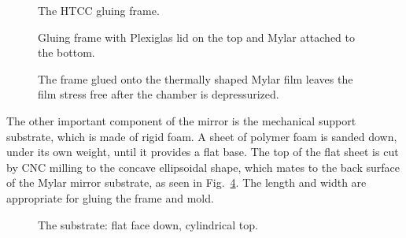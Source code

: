 \begin{figure}
\begin{center}
\caption{\small{The HTCC gluing frame.}}
\label{glue}
\end{center}
\end{figure} 

\begin{figure}
\begin{center}
\caption{\small{Gluing frame with Plexiglas lid on the top and Mylar 
attached to the bottom.}}
\label{glufr}
\end{center}
\end{figure}

\begin{figure}
\begin{center}
\caption{\small{The frame glued onto the thermally shaped Mylar film leaves 
the film stress free after the chamber is depressurized.}}
\label{glue_var}
\end{center} 
\end{figure}

The other important component of the mirror is the mechanical support
substrate, which is made of rigid foam.  A sheet of polymer foam is sanded 
down, under its own weight, until it provides a flat base.  The top of the 
flat sheet is cut by CNC milling to the concave ellipsoidal shape, which 
mates to the back surface of the Mylar mirror substrate, as seen in 
Fig.~\ref{flatface}.  The length and width are appropriate for gluing the 
frame and mold.

\begin{figure}
\begin{center}
\caption{\small{The substrate: flat face down, cylindrical top.}}
\label{flatface}
\end{center} 
\end{figure}

